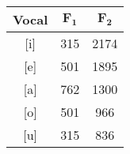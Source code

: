 \begin{tabular}{ccc}
	\toprule	
	\textbf{Vocal}&$\mathbf{F_1}$&$\mathbf{F_2}$\\
	\midrule
	{[}i{]}&315&2174\\
	{[}e{]}&501&1895\\
	{[}a{]}&762&1300\\
	{[}o{]}&501&966\\
	{[}u{]}&315&836\\
	\bottomrule
\end{tabular}
